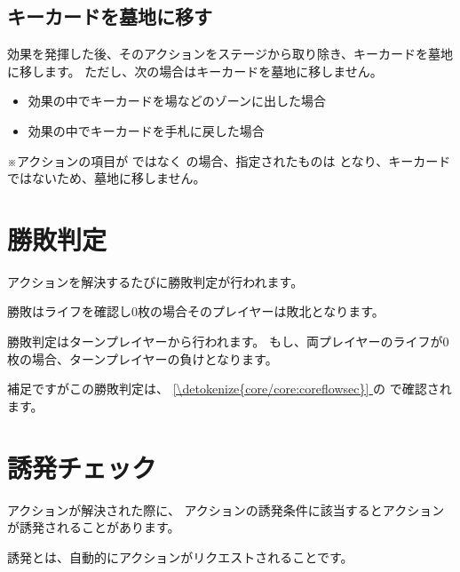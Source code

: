 \documentclass[letterpaper,10pt,dvipdfmx]{sphinxmanual}
\begin{document}
\subsection{キーカードを墓地に移す}
\label{\detokenize{common/common-action:keycard-gy}}\label{\detokenize{common/common-action:id14}}
\sphinxAtStartPar
効果を発揮した後、そのアクションをステージから取り除き、キーカードを墓地に移します。
ただし、次の場合はキーカードを墓地に移しません。
\begin{itemize}
\item {} 
\sphinxAtStartPar
効果の中でキーカードを場などのゾーンに出した場合

\item {} 
\sphinxAtStartPar
効果の中でキーカードを手札に戻した場合

\end{itemize}

\sphinxAtStartPar
※アクションの項目が  ではなく  の場合、指定されたものは  となり、キーカードではないため、墓地に移しません。


\section{勝敗判定}
\label{\detokenize{common/common-action:id15}}
\sphinxAtStartPar
アクションを解決するたびに勝敗判定が行われます。

\sphinxAtStartPar
勝敗はライフを確認し0枚の場合そのプレイヤーは敗北となります。

\sphinxAtStartPar
勝敗判定はターンプレイヤーから行われます。
もし、両プレイヤーのライフが0枚の場合、ターンプレイヤーの負けとなります。

\sphinxAtStartPar
補足ですがこの勝敗判定は、 \hyperref[\detokenize{core/core:coreflowsec}]{\ref{\detokenize{core/core:coreflowsec}} } の {\hyperref[\detokenize{core/core:winlose}]{}} で確認されます。


\section{誘発チェック}
\label{\detokenize{common/common-action:id16}}
\sphinxAtStartPar
アクションが解決された際に、
アクションの誘発条件に該当するとアクションが誘発されることがあります。

\sphinxAtStartPar
誘発とは、自動的にアクションがリクエストされることです。
\end{document}
